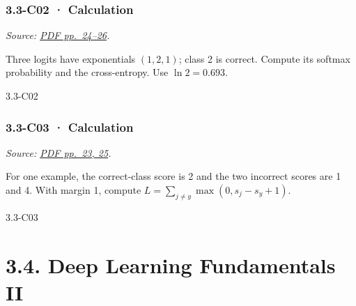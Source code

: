 \noindent\begin{minipage}{\linewidth}

\subsubsection{3.3-C02 · Calculation}\label{c02-calculation-9}

\emph{Source:
\href{../Lecture\%20Slides/3.3.\%20Deep\%20Learning\%20Fundamentals.pdf\#page=24}{PDF
pp.~24--26}.}

Three logits have exponentials \((1,2,1)\); class 2 is correct. Compute
its softmax probability and the cross-entropy. Use \(\ln2=0.693\).

\begin{solution}[26mm]{3.3-C02}

\end{solution}
\end{minipage}\par\medskip

\noindent\begin{minipage}{\linewidth}

\subsubsection{3.3-C03 · Calculation}\label{c03-calculation-9}

\emph{Source:
\href{../Lecture\%20Slides/3.3.\%20Deep\%20Learning\%20Fundamentals.pdf\#page=23}{PDF
pp.~23, 25}.}

For one example, the correct-class score is 2 and the two incorrect
scores are 1 and 4. With margin 1, compute
\(L=\sum_{j\ne y}\max(0,s_j-s_y+1)\).

\begin{solution}[26mm]{3.3-C03}

\end{solution}
\end{minipage}\par\medskip

\clearpage

\section{3.4. Deep Learning Fundamentals
II}\label{deep-learning-fundamentals-ii}

